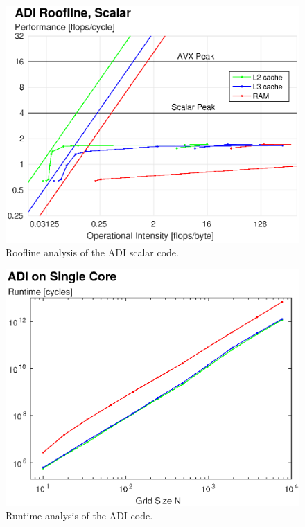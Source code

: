 \documentclass[letterpaper]{article}
\begin{document}
\begin{figure}\centering
  \includegraphics[width=\linewidth]{./plots/roofline_ADI_scalar.eps}
  \caption{Roofline analysis of the ADI scalar code.}
  \label{fig:roofline_ADI_scalar}
\end{figure}

\begin{figure}\centering
  \includegraphics[width=\linewidth]{./plots/runtime_ADI.eps}
  \caption{Runtime analysis of the ADI code.}
  \label{fig:runtime_ADI}
\end{figure}
\end{document}
